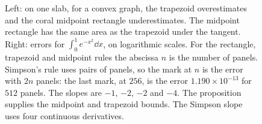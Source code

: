 \begin{figure}[ht]
\centering
{}
\caption{Left: on one slab, for a convex graph, the trapezoid overestimates and the coral midpoint rectangle underestimates. The midpoint rectangle has the same area as the trapezoid under the tangent. Right: errors for $\int_0^1 e^{-x^2}\dd x$, on logarithmic scales. For the rectangle, trapezoid and midpoint rules the abscissa $n$ is the number of panels. Simpson's rule uses pairs of panels, so the mark at $n$ is the error with $2n$ panels: the last mark, at $256$, is the error $1.190\times 10^{-13}$ for $512$ panels. The slopes are $-1$, $-2$, $-2$ and $-4$. The proposition supplies the midpoint and trapezoid bounds. The Simpson slope uses four continuous derivatives.}
\label{fig:quadrature}
\end{figure}

